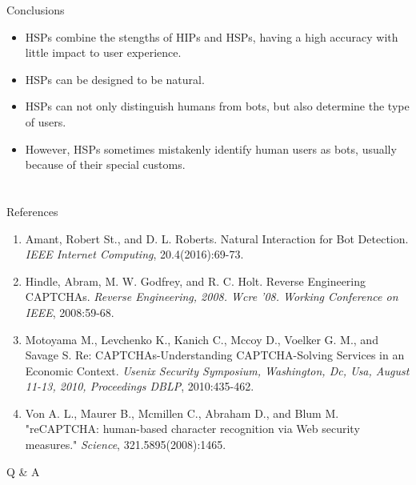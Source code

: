 \documentclass{beamer}
\begin{document}
  \begin{frame}{Conclusions}
    \begin{itemize}
      \item HSPs combine the stengths of HIPs and HSPs, having a high accuracy with little impact to user experience.
      \item HSPs can be designed to be natural.
      \item HSPs can not only distinguish humans from bots, but also determine the type of users.
      \item However, HSPs sometimes mistakenly identify human users as bots, usually because of their special customs.
    \end{itemize}
  \end{frame}

  \section*{}
  \begin{frame}{References}
    \scriptsize
    \begin{enumerate}[\lbrack 1\rbrack]
      \item Amant, Robert St., and D. L. Roberts. Natural Interaction for Bot Detection. \emph{IEEE Internet Computing}, 20.4(2016):69-73.
      \item Hindle, Abram, M. W. Godfrey, and R. C. Holt. Reverse Engineering CAPTCHAs. \emph{Reverse Engineering, 2008. Wcre '08. Working Conference on IEEE}, 2008:59-68.
      \item Motoyama M., Levchenko K., Kanich C., Mccoy D., Voelker G. M., and Savage S. Re: CAPTCHAs-Understanding CAPTCHA-Solving Services in an Economic Context. \emph{Usenix Security Symposium, Washington, Dc, Usa, August 11-13, 2010, Proceedings DBLP}, 2010:435-462.
      \item Von A. L., Maurer B., Mcmillen C., Abraham D., and Blum M. "reCAPTCHA: human-based character recognition via Web security measures." \emph{Science}, 321.5895(2008):1465.
    \end{enumerate}
  \end{frame}
  
  \begin{frame}{Q \& A}

  \end{frame}
\end{document}
